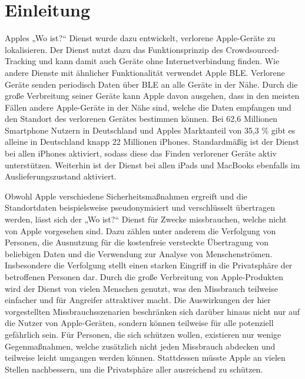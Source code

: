 
\section{Einleitung}

Apples „Wo ist?“ Dienst wurde dazu entwickelt, verlorene Apple-Geräte zu lokalisieren.
Der Dienst nutzt dazu das Funktionsprinzip des Crowdsourced-Tracking und kann damit auch Geräte ohne Internetverbindung finden.
Wie andere Dienste mit ähnlicher Funktionalität verwendet Apple \ac{BLE}.
Verlorene Geräte senden periodisch Daten über \ac{BLE} an alle Geräte in der Nähe.
Durch die große Verbreitung seiner Geräte kann Apple davon ausgehen, dass in den meisten Fällen andere Apple-Geräte in der Nähe sind, welche die Daten empfangen und den Standort des verlorenen Gerätes bestimmen können.
Bei 62,6 Millionen Smartphone Nutzern in Deutschland \cite{Statista_SmartphonesDeutschland} und Apples Marktanteil von 35,3 \% \cite{Statscounter_Marktanteil_iOS} gibt es alleine in Deutschland knapp 22 Millionen iPhones.
Standardmäßig ist der Dienst bei allen iPhones aktiviert, sodass diese das Finden verlorener Geräte aktiv unterstützen.
Weiterhin ist der Dienst bei allen iPads und MacBooks ebenfalls im Auslieferungszustand aktiviert.


Obwohl Apple verschiedene Sicherheitsmaßnahmen ergreift und die Standortdaten beispielsweise pseudonymisiert und verschlüsselt übertragen werden, lässt sich der „Wo ist?“ Dienst für Zwecke missbrauchen, welche nicht von Apple vorgesehen sind.
Dazu zählen unter anderem die Verfolgung von Personen, die Ausnutzung für die kostenfreie versteckte Übertragung von beliebigen Daten und die Verwendung zur Analyse von Menschenströmen.
Insbesondere die Verfolgung stellt einen starken Eingriff in die Privatsphäre der betroffenen Personen dar.
Durch die große Verbreitung von Apple-Produkten wird der Dienst von vielen Menschen genutzt, was den Missbrauch teilweise einfacher und für Angreifer attraktiver macht.
Die Auswirkungen der hier vorgestellten Missbrauchsszenarien beschränken sich darüber hinaus nicht nur auf die Nutzer von Apple-Geräten, sondern können teilweise für alle potenziell gefährlich sein.
Für Personen, die sich schützen wollen, existieren nur wenige Gegenmaßnahmen, welche zusätzlich nicht jeden Missbrauch abdecken und teilweise leicht umgangen werden können.
Stattdessen müsste Apple an vielen Stellen nachbessern, um die Privatsphäre aller ausreichend zu schützen.


